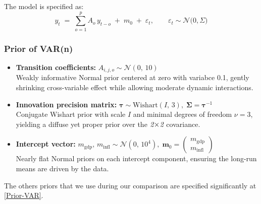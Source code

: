 \documentclass{Configuration_Files/PoliMi3i_thesis}
\begin{document}
The model is specified as:
\[
{y}_t
\;=\;
\sum_{o=1}^{p} A_{o}\,y_{t-o}
\;+\;
m_{0}
\;+\;
\varepsilon_t,
\qquad
\varepsilon_t \sim \mathcal{N}\bigl(0,\Sigma)
\]

\subsubsection{Prior of VAR(n)}
\begin{itemize}
    \item \textbf{Transition coefficients:}  
    $A_{i,j,o} \sim \mathcal{N}(0,\,10)$\\
    Weakly informative Normal prior centered at zero with variabce 0.1, gently shrinking cross-variable effect while allowing moderate dynamic interactions.
    \item \textbf{Innovation precision matrix:}  
    $\boldsymbol{\tau} \sim \mathrm{Wishart}(I,\,3),\;\boldsymbol{\Sigma}=\boldsymbol{\tau}^{-1}$\\
    Conjugate Wishart prior with scale \(I\) and minimal degrees of freedom \(\nu=3\), yielding a diffuse yet proper prior over the $\text{\itshape 2}\!\times\!\text{\itshape 2}$ covariance.
    \item \textbf{Intercept vector:}  
    $m_{\text{gdp}},\,m_{\text{infl}} \sim \mathcal{N}(0,\,10^4),\;\mathbf{m}_0=\begin{pmatrix}m_{\text{gdp}}\\m_{\text{infl}}\end{pmatrix}$\\
    Nearly flat Normal priors on each intercept component, ensuring the long-run means are driven by the data.
\end{itemize}
The others priors that we use during our comparison are specified significantly at \ref{Prior-VAR}.
\end{document}
